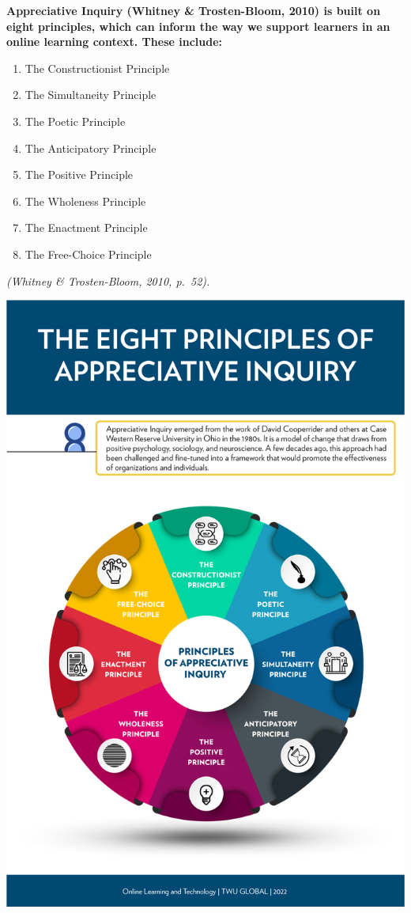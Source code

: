 \documentclass[
]{book}
\providecommand{\tightlist}{%
  \setlength{\itemsep}{0pt}\setlength{\parskip}{0pt}}
\begin{document}
\textbf{Appreciative Inquiry (Whitney \& Trosten-Bloom, 2010) is built on eight principles, which can inform the way we support learners in an online learning context. These include:}

\begin{enumerate}
\def\labelenumi{\arabic{enumi}.}
\tightlist
\item
  The Constructionist Principle\\
\item
  The Simultaneity Principle\\
\item
  The Poetic Principle\\
\item
  The Anticipatory Principle\\
\item
  The Positive Principle\\
\item
  The Wholeness Principle\\
\item
  The Enactment Principle\\
\item
  The Free-Choice Principle
\end{enumerate}

\emph{(Whitney \& Trosten-Bloom, 2010, p.~52).}

\includegraphics{assets/unit5/Principles-of-AI-with-description.jpg}
\end{document}
